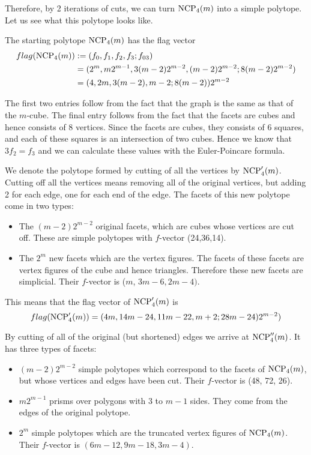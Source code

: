Therefore, by 2 iterations of cuts, we can turn $\textrm{NCP}_4(m)$ into a simple 
polytope. Let us see what this polytope looks like. 

The starting polytope $\textrm{NCP}_4(m)$ has the flag vector 
\begin{align}
 flag(\textrm{NCP}_4(m)) &:= (f_0, f_1, f_2, f_3; f_{03}) \\
	&= (2^m, m2^{m-1}, 3(m-2)2^{m-2}, (m-2)2^{m-2}; 8(m-2)2^{m-2}) \\
	&= (4, 2m, 3(m-2), m-2; 8(m-2))2^{m-2}
\end{align}

The first two entries follow from the fact that the graph is the same as that 
of the $m$-cube. The final entry follows from the fact that the facets are 
cubes and hence consists of 8 vertices. Since the facets are cubes, they 
consists of 6 squares, and each of these squares is an intersection of two 
cubes. Hence we know that $3f_2 = f_3$ and we can calculate these values with 
the Euler-Poincare formula.

We denote the polytope formed by cutting of all the vertices by $\textrm{NCP}'_4(m)$.
Cutting off all the vertices means removing all of the original vertices, but 
adding 2 for each edge, one for each end of the edge. The facets of this new 
polytope come in two types:

\begin{itemize}
 \item The $(m-2)2^{m-2}$ original facets, which are cubes whose vertices are 
cut off. These are simple polytopes with $f$-vector (24,36,14).
 \item The $2^m$ new facets which are the vertex figures. The facets of these 
facets are vertex figures of the cube and hence triangles. Therefore these 
new facets are simplicial. Their $f$-vector is ($m$, 
$3m-6, 2m-4)$.
\end{itemize}

This means that the flag vector of $\textrm{NCP}'_4(m)$ is 
\begin{equation}
 flag(\textrm{NCP}'_4(m)) = (4m, 14m-24, 11m-22, m+2; 28m-24)2^{m-2})
\end{equation}

By cutting of all of the original (but shortened) edges we arrive at 
$\textrm{NCP}''_4(m)$. It has three types of facets:

\begin{itemize}
 \item $(m-2)2^{m-2}$ simple polytopes which correspond to the facets of 
$\textrm{NCP}_4(m)$, but whose vertices and edges have been cut. Their $f$-vector is 
(48, 72, 26).
\item $m2^{m-1}$ prisms over polygons with $3$ to $m-1$ sides. They come from 
the edges of the original polytope.
\item $2^m$ simple polytopes which are the truncated vertex figures of 
$\textrm{NCP}_4(m)$. Their $f$-vector is $(6m - 12, 9m-18, 3m-4)$.
\end{itemize}

